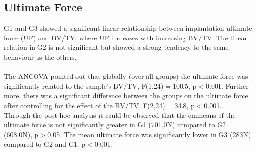 \documentclass[12pt, a4paper, twoside]{report}
\begin{document}
\subsection{Ultimate Force}
%
\begin{figure}[H]
\centering 
{}
\label{fig:UF_exp}
\end{figure}
%
\begin{table}[H]
\centering
{}
\caption{Results for the linear regression (RSE: residual standard error, CV: coefficient of variation) of the experimentally evaluated ultimate force values. And the evaluation of the ANCOVA by the emmeans after Bonferroni correction.}
\label{tab:LGuf}
\end{table}
%
G1 and G3 showed a significant linear relationship between implantation ultimate force (UF) and BV/TV, where UF increases with increasing BV/TV. The linear relation in G2 is not significant but showed a strong tendency to the same behaviour as the others.\\
\\
The ANCOVA pointed out that globally (over all groups) the ultimate force was significantly related to the sample's BV$/$TV, F(1,24)$=$100.5, p$<$0.001. Further more, there was a significant difference between the groups on the ultimate force after controlling for the effect of the BV$/$TV, F(2,24)$=$34.8, p$<$0.001.\\
Through the post hoc analysis it could be observed that the emmeans of the ultimate force is not significantly greater in G1 (701.0N) compared to G2 (608.0N), p$>$0.05. The mean ultimate force was significantly lower in G3 (283N) compared to G2 and G1. p$<$0.001.
%
%
%
\newpage
%
%
%
\end{document}
